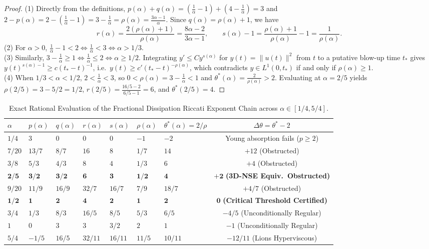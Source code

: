 \documentclass[11pt,a4paper]{article}
\theoremstyle{definition}
\theoremstyle{remark}
\begin{document}
\begin{proof}
(1) Directly from the definitions, $p(\alpha) + q(\alpha) = (\frac{1}{\alpha}-1) + (4-\frac{1}{\alpha}) = 3$ and $2 - p(\alpha) = 2 - (\frac{1}{\alpha}-1) = 3 - \frac{1}{\alpha} = \rho(\alpha) = \frac{3\alpha-1}{\alpha}$. Since $q(\alpha) = \rho(\alpha) + 1$, we have
\[
r(\alpha) = \frac{2(\rho(\alpha)+1)}{\rho(\alpha)} = \frac{8\alpha - 2}{3\alpha - 1}, \qquad
s(\alpha) - 1 = \frac{\rho(\alpha)+1}{\rho(\alpha)} - 1 = \frac{1}{\rho(\alpha)}.
\]
(2) For $\alpha > 0$, $\frac{1}{\alpha} - 1 < 2 \iff \frac{1}{\alpha} < 3 \iff \alpha > 1/3$.\\
(3) Similarly, $3 - \frac{1}{\alpha} \ge 1 \iff \frac{1}{\alpha} \le 2 \iff \alpha \ge 1/2$. Integrating $y' \le C y^{s(\alpha)}$ for $y(t) = \|u(t)\|^2$ from $t$ to a putative blow-up time $t_*$ gives $y(t)^{s(\alpha)-1} \ge c (t_* - t)^{-1}$, i.e.\ $y(t) \ge c'(t_* - t)^{-\rho(\alpha)}$, which contradicts $y \in L^1(0, t_*)$ if and only if $\rho(\alpha) \ge 1$.\\
(4) When $1/3 < \alpha < 1/2$, $2 < \frac{1}{\alpha} < 3$, so $0 < \rho(\alpha) = 3 - \frac{1}{\alpha} < 1$ and $\theta^*(\alpha) = \frac{2}{\rho(\alpha)} > 2$. Evaluating at $\alpha = 2/5$ yields $\rho(2/5) = 3 - 5/2 = 1/2$, $r(2/5) = \frac{16/5 - 2}{6/5 - 1} = 6$, and $\theta^*(2/5) = 4$.
\end{proof}

\begin{table}[ht!]
\centering
\caption{Exact Rational Evaluation of the Fractional Dissipation Riccati Exponent Chain across $\alpha \in [1/4, 5/4]$.}
\label{tab:riccati}
\small
\begin{tabular}{@{}lllllllc@{}}
\toprule
$\alpha$ & $p(\alpha)$ & $q(\alpha)$ & $r(\alpha)$ & $s(\alpha)$ & $\rho(\alpha)$ & $\theta^*(\alpha) = 2/\rho$ & $\Delta\theta = \theta^* - 2$ \\
\midrule
$1/4$ & $3$ & $0$ & $0$ & $0$ & $-1$ & $-2$ & Young absorption fails ($p \ge 2$) \\
$7/20$ & $13/7$ & $8/7$ & $16$ & $8$ & $1/7$ & $14$ & $+12$ (Obstructed) \\
$3/8$ & $5/3$ & $4/3$ & $8$ & $4$ & $1/3$ & $6$ & $+4$ (Obstructed) \\
$\mathbf{2/5}$ & $\mathbf{3/2}$ & $\mathbf{3/2}$ & $\mathbf{6}$ & $\mathbf{3}$ & $\mathbf{1/2}$ & $\mathbf{4}$ & $\mathbf{+2}$ \textbf{(3D-NSE Equiv.\ Obstructed)} \\
$9/20$ & $11/9$ & $16/9$ & $32/7$ & $16/7$ & $7/9$ & $18/7$ & $+4/7$ (Obstructed) \\
$\mathbf{1/2}$ & $\mathbf{1}$ & $\mathbf{2}$ & $\mathbf{4}$ & $\mathbf{2}$ & $\mathbf{1}$ & $\mathbf{2}$ & $\mathbf{0}$ \textbf{(Critical Threshold Certified)} \\
$3/4$ & $1/3$ & $8/3$ & $16/5$ & $8/5$ & $5/3$ & $6/5$ & $-4/5$ (Unconditionally Regular) \\
$1$ & $0$ & $3$ & $3$ & $3/2$ & $2$ & $1$ & $-1$ (Unconditionally Regular) \\
$5/4$ & $-1/5$ & $16/5$ & $32/11$ & $16/11$ & $11/5$ & $10/11$ & $-12/11$ (Lions Hyperviscous) \\
\bottomrule
\end{tabular}
\end{table}
\end{document}
